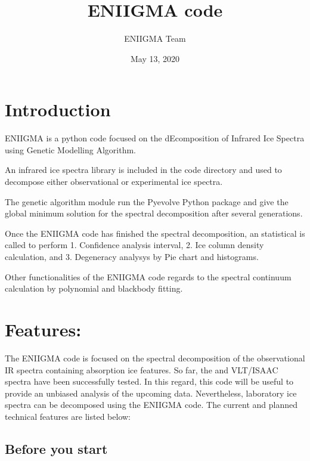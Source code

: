 \documentclass[letterpaper,10pt,english]{sphinxmanual}
\title{ENIIGMA code}
\date{May 13, 2020}
\author{ENIIGMA Team}
\begin{document}
\pagestyle{empty}
\sphinxmaketitle
\pagestyle{plain}
\sphinxtableofcontents
\pagestyle{normal}
\label{\detokenize{index::doc}}



\chapter{Introduction}
\label{\detokenize{index:introduction}}
ENIIGMA is a python code focused on the dEcomposition of Infrared Ice Spectra using Genetic Modelling Algorithm.

An infrared ice spectra library is included in the code directory and used to decompose either observational or experimental ice spectra.

The genetic algorithm module run the Pyevolve Python package and give the global minimum solution for the spectral decomposition after several generations.

Once the ENIIGMA code has finished the spectral decomposition, an statistical is called to perform 1. Confidence analysis interval, 2. Ice column density calculation,
and 3. Degeneracy analysys by Pie chart and histograms.

Other functionalities of the ENIIGMA code regards to the spectral continuum calculation by polynomial and blackbody fitting.


\chapter{Features:}
\label{\detokenize{index:features}}
The ENIIGMA code is focused on the spectral decomposition of the observational IR spectra containing absorption ice features. So far, the  and VLT/ISAAC spectra
have been successfully tested. In this regard, this code will be useful to provide an unbiased analysis of the upcoming  data. Nevertheless,
laboratory ice spectra can be decomposed using the ENIIGMA code. The current and planned technical features are listed below:


\section{Before you start}
\label{\detokenize{beforeyoubegin:before-you-start}}\label{\detokenize{beforeyoubegin:settingup}}\label{\detokenize{beforeyoubegin::doc}}
\end{document}
